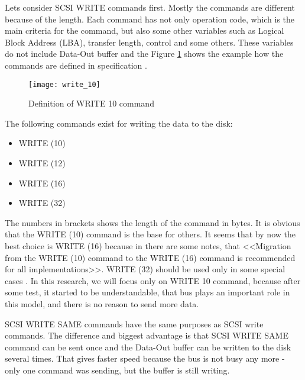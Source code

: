 Lets consider SCSI WRITE commands first. Mostly the commands are different because of the length. Each command has not only operation code, which is the main criteria for the command, but also some other variables such as Logical Block Address (LBA), transfer length, control and some others. These variables do not include Data-Out buffer and the Figure \ref{fig:write_10} shows the example how the commands are defined in specification \cite{scsi3_bc}.
\begin{figure}[h]
\begin{center}
  \texttt{[image: write\_10]}
\end{center}
  \caption{Definition of WRITE 10 command}
  \label{fig:write_10}
\end{figure}

The following commands exist for writing the data to the disk:
\begin{itemize}%
	\setlength{\itemsep}{-2mm}
	\item WRITE (10)
	\item WRITE (12)
	\item WRITE (16)
	\item WRITE (32)
\end{itemize}
The numbers in brackets shows the length of the command in bytes. It is obvious that the WRITE (10) command is the base for others. It seems that by now the best choice is WRITE (16) because in \cite{scsi3_bc} there are some notes, that <<Migration from the WRITE (10) command to the WRITE (16) command is recommended for all implementations>>. WRITE (32) should be used only in some special cases \cite{scsi3_bc}. In this research, we will focus only on WRITE 10 command, because after some test, it started to be understandable, that bus plays an important role in this model, and there is no reason to send more data.

SCSI WRITE SAME commands have the same purposes as SCSI write commands. The difference and biggest advantage is that SCSI WRITE SAME command can be sent once and the Data-Out buffer can be written to the disk several times. That gives faster speed because the bus is not busy any more - only one command was sending, but the buffer is still writing. 

